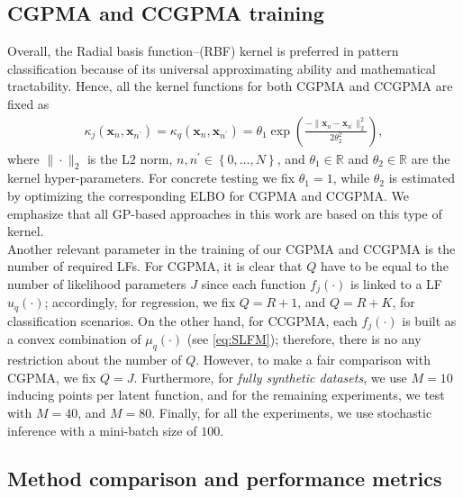 \documentclass[journal]{IEEEtran}
\providecommand{\ve}[1]{{\bm{#1}}}%
\newcommand{\Real}{\mathbb{R}}
\providecommand{\ve}[1]{{\mathbf{#1}}}
\begin{document}
\subsection{CGPMA and CCGPMA training}\label{sec:training}
Overall, the Radial basis function--(RBF) kernel is preferred in pattern classification because of its universal approximating ability and mathematical tractability. Hence, all the kernel functions for both CGPMA and CCGPMA are fixed as
\begin{align}\label{eq:RBF}
\kappa_j(\ve{x}_n, \ve{x}_{n^{\prime}})=\kappa_q(\ve{x}_n, \ve{x}_{n^{\prime}}) = \theta_1\exp\left(\frac{-\|\ve{x}_n- \ve{x}_{n^{\prime}} \|_2^2}{2{\theta}_2^2}\right),
\end{align}
where $\|\cdot\|_2$ is the L$2$ norm, $n,n^{\prime} \in \left\{0,\dots , N\right\}$, and $\theta_1\in \Real$ and ${\theta}_2\in \Real$ are the kernel hyper-parameters. For concrete testing we fix $\theta_1 = 1$, while ${\theta}_2$ is estimated by optimizing the corresponding ELBO for CGPMA and CCGPMA. We emphasize that all GP-based approaches in this work are based on this type of kernel.\\
Another relevant parameter in the training of our CGPMA and CCGPMA is the number of required LFs. For CGPMA, it is clear that $Q$ have to be equal to the number of likelihood parameters $J$ since each function $f_j(\cdot)$ is linked to a LF $u_q(\cdot)$; accordingly, for regression, we fix $Q=R+1$, and $Q=R+K$, for classification scenarios. On the other hand, for CCGPMA, each $f_j(\cdot)$ is built as a convex combination of $\mu_q(\cdot)$ (see \cref{eq:SLFM}); therefore, there is no any restriction about the number of $Q$. However, to make a fair comparison with CGPMA, we fix $Q=J$. Furthermore, for \textit{fully synthetic datasets}, we use $M=10$ inducing points per latent function, and for the remaining experiments, we test with $M=40$, and $M=80$. Finally, for all the experiments, we use stochastic inference with a mini-batch size of $100$.

\subsection{Method comparison and performance metrics}
\end{document}
